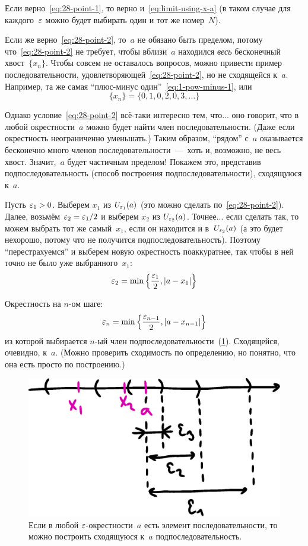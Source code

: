 \documentclass[a4paper,12pt]{article}
\begin{document}
  \begin{solution}
    Если верно~\eqref{eq:28-point-1}, то верно и~\eqref{eq:limit-using-x-a} (в таком случае для каждого~$\varepsilon$ можно будет выбирать один и тот же номер~$N$).
    
    Если же верно~\eqref{eq:28-point-2}, то~$a$ не обязано быть пределом, потому что~\eqref{eq:28-point-2} не требует, чтобы вблизи~$a$ находился \emph{весь} бесконечный хвост~$\{x_n\}$.
    Чтобы совсем не оставалось вопросов, можно привести пример последовательности, удовлетворяющей~\eqref{eq:28-point-2}, но не сходящейся к~$a$.
    Например, та же самая ``плюс-минус один''~\eqref{eq:1-pow-minus-1}, или
    \[
      \{x_n\} = \{0, 1, 0, 2, 0, 3, \ldots\}
    \]
    
    Однако условие~\eqref{eq:28-point-2} всё-таки интересно тем, что... оно говорит, что в любой окрестности~$a$ можно будет найти член последовательности.
    (Даже если окрестность неограниченно уменьшать.)
    Таким образом, ``рядом'' с~$a$ оказывается бесконечно много членов последовательности~---~хоть и, возможно, не весь хвост.
    Значит,~$a$ будет частичным пределом!
    Покажем это, представив подпоследовательность (способ построения подпоследовательности), сходящуюся к~$a$.
    
    Пусть $\eps_1 \hm> 0$.
    Выберем $x_1$ из $U_{\varepsilon_1}(a)$ (это можно сделать по~\eqref{eq:28-point-2}).
    Далее, возьмём $\eps_2 \hm= \eps_1/2$ и выберем $x_2$ из $U_{\varepsilon_2}(a)$.
    Точнее... если сделать так, то можем выбрать тот же самый~$x_1$, если он находится и в~$U_{\varepsilon_2}(a)$ (а это будет нехорошо, потому что не получится подпоследовательность).
    Поэтому ``перестрахуемся'' и выберем новую окрестность поаккуратнее, так чтобы в ней точно не было уже выбранного~$x_1$:
    \[
      \varepsilon_2 = \min\left\{\frac{\varepsilon_1}{2}, \left|a - x_1\right|\right\}
    \]
    
    Окрестность на $n$-ом шаге:
    \[
      \varepsilon_n = \min\left\{\frac{\varepsilon_{n - 1}}{2}, \left|a - x_{n - 1}\right|\right\}
    \]
    из которой выбирается $n$-ый член подпоследовательности~(\ref{fig:xn-to-a}).
    Сходящейся, очевидно, к~$a$.
    (Можно проверить сходимость по определению, но понятно, что она есть просто по построению.)
    
    \begin{figure}[ht]
      \centering
      \includegraphics[width=0.6\linewidth]{images/xn-to-a}
      
      \caption{
        Если в любой $\varepsilon$-окрестности~$a$ есть элемент последовательности, то можно построить сходящуюся к~$a$ подпоследовательность.
      }
      \label{fig:xn-to-a}
    \end{figure}
 
  \end{solution}
  
\end{document}
